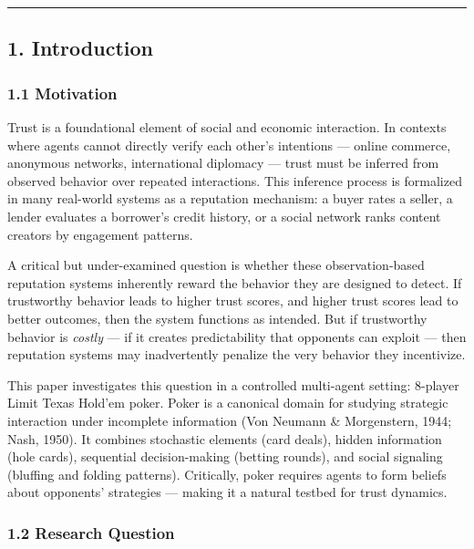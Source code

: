 \documentclass[
]{article}
\begin{document}
\begin{center}\rule{0.5\linewidth}{0.5pt}\end{center}

\hypertarget{introduction}{%
\subsection{1. Introduction}\label{introduction}}

\hypertarget{motivation}{%
\subsubsection{1.1 Motivation}\label{motivation}}

Trust is a foundational element of social and economic interaction. In
contexts where agents cannot directly verify each other's intentions ---
online commerce, anonymous networks, international diplomacy --- trust
must be inferred from observed behavior over repeated interactions. This
inference process is formalized in many real-world systems as a
reputation mechanism: a buyer rates a seller, a lender evaluates a
borrower's credit history, or a social network ranks content creators by
engagement patterns.

A critical but under-examined question is whether these
observation-based reputation systems inherently reward the behavior they
are designed to detect. If trustworthy behavior leads to higher trust
scores, and higher trust scores lead to better outcomes, then the system
functions as intended. But if trustworthy behavior is \emph{costly} ---
if it creates predictability that opponents can exploit --- then
reputation systems may inadvertently penalize the very behavior they
incentivize.

This paper investigates this question in a controlled multi-agent
setting: 8-player Limit Texas Hold'em poker. Poker is a canonical domain
for studying strategic interaction under incomplete information (Von
Neumann \& Morgenstern, 1944; Nash, 1950). It combines stochastic
elements (card deals), hidden information (hole cards), sequential
decision-making (betting rounds), and social signaling (bluffing and
folding patterns). Critically, poker requires agents to form beliefs
about opponents' strategies --- making it a natural testbed for trust
dynamics.

\hypertarget{research-question}{%
\subsubsection{1.2 Research Question}\label{research-question}}
\end{document}
